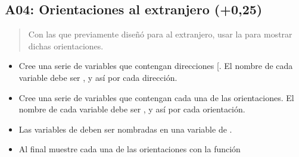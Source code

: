 \documentclass[letterpaper,10pt,spanish]{sphinxmanual}
\begin{document}
\subsection{A04: Orientaciones al extranjero (+0,25)}
\label{\detokenize{1_guias/10programacion/G1025:a04-orientaciones-al-extranjero-0-25}}
\sphinxAtStartPar
{}
\begin{quote}

\sphinxAtStartPar
Con las  que previamente diseñó para al extranjero, usar la  para mostrar dichas orientaciones.
\end{quote}
\begin{itemize}
\item {} 
\sphinxAtStartPar
Cree una serie de variables que contengan direcciones {[}\sphinxstylestrong{ejemplo: Cra 3A \# 7\sphinxhyphen{}01 (IE John F. Kennedy)}{]}. El nombre de cada variable debe ser ,  y así por cada dirección.

\item {} 
\sphinxAtStartPar
Cree una serie de variables que contengan cada una de las orientaciones. El nombre de cada variable debe ser ,  y así por cada orientación.

\item {} 
\sphinxAtStartPar
Las variables de  deben ser nombradas en una variable de .

\item {} 
\sphinxAtStartPar
Al final muestre cada una de las orientaciones con la función 

\end{itemize}
\end{document}
